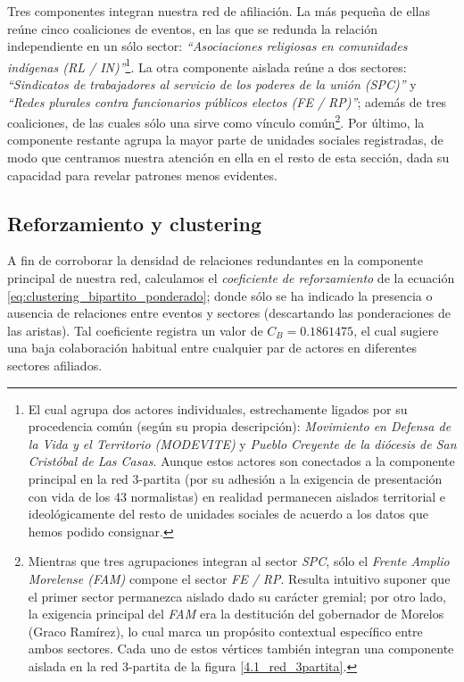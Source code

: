 \documentclass[letterpaper, 11pt]{book}
\theoremstyle{definition}
\theoremstyle{remark}
\begin{document}
Tres componentes integran nuestra red de afiliación. 
La más pequeña de ellas reúne cinco coaliciones de eventos, en las que se redunda la relación independiente en un sólo sector: \emph{``Asociaciones religiosas en comunidades indígenas (RL / IN)''}\footnote{
    El cual agrupa dos actores individuales, estrechamente ligados por su procedencia común (según su propia descripción): \emph{Movimiento en Defensa de la Vida y el Territorio (MODEVITE)} y \emph{Pueblo Creyente de la diócesis de San Cristóbal de Las Casas}. 
    Aunque estos actores son conectados a la componente principal en la red 3-partita (por su adhesión a la exigencia de presentación con vida de los 43 normalistas) en realidad permanecen aislados territorial e ideológicamente del resto de unidades sociales de acuerdo a los datos que hemos podido consignar. 
}. 
La otra componente aislada reúne a dos sectores: \emph{``Sindicatos de trabajadores al servicio de los poderes de la unión (SPC)''} y \emph{``Redes plurales contra funcionarios públicos electos (FE / RP)''}; además de tres coaliciones, de las cuales sólo una sirve como vínculo común\footnote{
    Mientras que tres agrupaciones integran al sector \emph{SPC}, sólo el \emph{Frente Amplio Morelense (FAM)} compone el sector \emph{FE / RP}. 
    Resulta intuitivo suponer que el primer sector permanezca aislado dado su carácter gremial; por otro lado, la exigencia principal del \emph{FAM} era la destitución del gobernador de Morelos (Graco Ramírez), lo cual marca un propósito contextual específico entre ambos sectores. 
    Cada uno de estos vértices también integran una componente aislada en la red 3-partita de la figura \ref{4.1_red_3partita}.
}. 
Por último, la componente restante agrupa la mayor parte de unidades sociales registradas, de modo que centramos nuestra atención en ella en el resto de esta sección, dada su capacidad para revelar patrones menos evidentes. 





\subsection{Reforzamiento y clustering}
\label{subsec:Reforzamiento_TiposEps}

A fin de corroborar la densidad de relaciones redundantes en la componente principal de nuestra red, calculamos el \emph{coeficiente de reforzamiento} de la ecuación \ref{eq:clustering_bipartito_ponderado}; donde sólo se ha indicado la presencia o ausencia de relaciones entre eventos y sectores (descartando las ponderaciones de las aristas). 
Tal coeficiente registra un valor de $C_{B} = 0.1861475$, el cual sugiere una baja colaboración habitual entre cualquier par de actores en diferentes sectores afiliados. 
\end{document}

